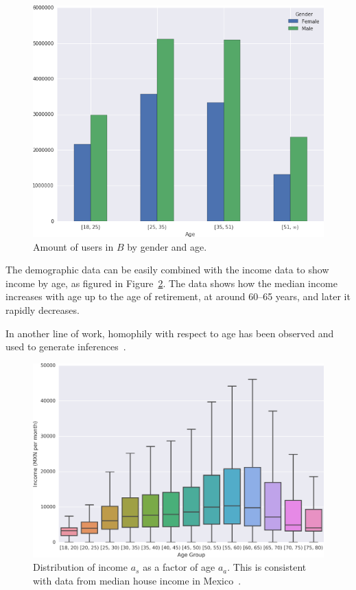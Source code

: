 \begin{figure}
\centering
\includegraphics[width=0.9\columnwidth]{figures/gender_age_bar3/gender_age_bar3.png}
\caption{Amount of users in $B$ by gender and age.}
\label{fig:gender_age_bar}
\end{figure}

The demographic data can be easily combined with the income data to show income by age, as figured in Figure~\ref{fig:income_age_boxplot}. The data shows how the median income increases with age up to the age of retirement, at around 60--65 years, and later it rapidly decreases.

In another line of work, homophily with respect to age has been observed and used to generate inferences~\cite{brea2014}.

\begin{figure}
\centering
\includegraphics[width=0.9\columnwidth]{figures/income_age_boxplot4/income_age_boxplot4.png}
\caption{Distribution of income $a_s$ as a factor of age $a_a$. This is consistent with data from median house income in Mexico~\cite{gallup2013}.}
\label{fig:income_age_boxplot}
\end{figure}

